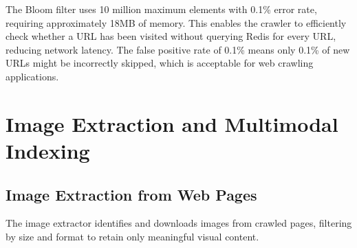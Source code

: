 The Bloom filter uses 10 million maximum elements with 0.1\% error rate, requiring approximately 18MB of memory. This enables the crawler to efficiently check whether a URL has been visited without querying Redis for every URL, reducing network latency. The false positive rate of 0.1\% means only 0.1\% of new URLs might be incorrectly skipped, which is acceptable for web crawling applications.

\clearpage

\section{Image Extraction and Multimodal Indexing}

\subsection{Image Extraction from Web Pages}

The image extractor identifies and downloads images from crawled pages, filtering by size and format to retain only meaningful visual content.


